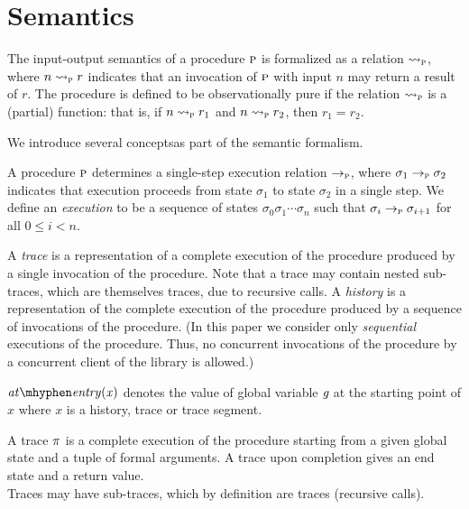 \newcommand{\iosem}[1]{\rightsquigarrow_{#1}}
\newcommand{\sssem}[1]{\rightarrow_{#1}}

\section{Semantics}

The input-output semantics of a procedure $\textsc{p}$ is formalized as a relation $\iosem{\proc}$, where $n \iosem{\proc} r$ indicates
that an invocation of $\textsc{p}$ with input $n$ may return a result of $r$. The procedure is defined to be observationally
pure if the relation $\iosem{\proc}$ is a (partial) function: that is, if 
$n \iosem{\proc} r_1$ and $n \iosem{\proc} r_2$, then $r_1 = r_2$.

We introduce several conceptsas part of the semantic formalism.

A procedure $\textsc{p}$ determines a single-step execution relation $\sssem{\proc}$, where $\sigma_1 \sssem{\proc} \sigma_2$ indicates
that execution proceeds from state $\sigma_1$ to state $\sigma_2$ in a single step.
We define an \emph{execution} to be a sequence of states $\sigma_0 \sigma_1 \cdots \sigma_n$ such that
$\sigma_i \sssem{\proc} \sigma_{i+1}$ for all $0 \leq i < n$.

A \emph{trace} is a representation of a complete execution of the procedure produced by a single
invocation of the procedure. Note that a trace may contain nested sub-traces,
which are themselves traces, due to recursive calls.
A \emph{history} is a representation of the complete  execution of the procedure produced by a
sequence of invocations of the procedure.
(In this paper we consider only \emph{sequential} executions of the procedure. Thus, no concurrent invocations
of the procedure by a concurrent client of the library is allowed.)


\begin{definition} 
  $\\\atEntry{x}$ denotes the value of global variable $\textit{g}$ at the
  starting point of $x$ where $x$ is a history, trace or trace
  segment.
\end{definition}

\begin{definition}[trace]
  A trace $\pi$ is a complete execution of the procedure starting
  from a given global state and a tuple of formal arguments. A trace
  upon completion gives an end state and a return value.\\ Traces may
  have sub-traces, which by definition are traces (recursive calls).
\end{definition}

